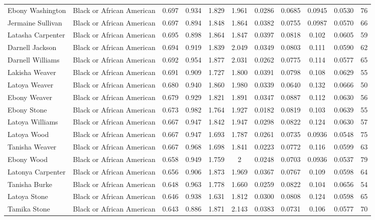\documentclass[]{article}
\begin{document}
\begin{tabular}{lcccccccccc}
Ebony Washington & Black or African American & 0.697 & 0.934 & 1.829 & 1.961 & 0.0286 & 0.0685 & 0.0945 & 0.0530 & 76 \\
Jermaine Sullivan & Black or African American & 0.697 & 0.894 & 1.848 & 1.864 & 0.0382 & 0.0755 & 0.0987 & 0.0570 & 66 \\
Latasha Carpenter & Black or African American & 0.695 & 0.898 & 1.864 & 1.847 & 0.0397 & 0.0818 & 0.102 & 0.0605 & 59 \\
Darnell Jackson & Black or African American & 0.694 & 0.919 & 1.839 & 2.049 & 0.0349 & 0.0803 & 0.111 & 0.0590 & 62 \\
Darnell Williams & Black or African American & 0.692 & 0.954 & 1.877 & 2.031 & 0.0262 & 0.0775 & 0.114 & 0.0577 & 65 \\
Lakisha Weaver & Black or African American & 0.691 & 0.909 & 1.727 & 1.800 & 0.0391 & 0.0798 & 0.108 & 0.0629 & 55 \\
Latoya Weaver & Black or African American & 0.680 & 0.940 & 1.860 & 1.980 & 0.0339 & 0.0640 & 0.132 & 0.0666 & 50 \\
Ebony Weaver & Black or African American & 0.679 & 0.929 & 1.821 & 1.891 & 0.0347 & 0.0887 & 0.112 & 0.0630 & 56 \\
Ebony Stone & Black or African American & 0.673 & 0.982 & 1.764 & 1.927 & 0.0182 & 0.0819 & 0.103 & 0.0639 & 55 \\
Latoya Williams & Black or African American & 0.667 & 0.947 & 1.842 & 1.947 & 0.0298 & 0.0822 & 0.124 & 0.0630 & 57 \\
Latoya Wood & Black or African American & 0.667 & 0.947 & 1.693 & 1.787 & 0.0261 & 0.0735 & 0.0936 & 0.0548 & 75 \\
Tanisha Weaver & Black or African American & 0.667 & 0.968 & 1.698 & 1.841 & 0.0223 & 0.0772 & 0.116 & 0.0599 & 63 \\
Ebony Wood & Black or African American & 0.658 & 0.949 & 1.759 & 2 & 0.0248 & 0.0703 & 0.0936 & 0.0537 & 79 \\
Latonya Carpenter & Black or African American & 0.656 & 0.906 & 1.873 & 1.969 & 0.0367 & 0.0767 & 0.109 & 0.0598 & 64 \\
Tanisha Burke & Black or African American & 0.648 & 0.963 & 1.778 & 1.660 & 0.0259 & 0.0822 & 0.104 & 0.0656 & 54 \\
Latoya Stone & Black or African American & 0.646 & 0.938 & 1.631 & 1.812 & 0.0300 & 0.0808 & 0.124 & 0.0598 & 65 \\
Tamika Stone & Black or African American & 0.643 & 0.886 & 1.871 & 2.143 & 0.0383 & 0.0731 & 0.106 & 0.0577 & 70 \\

\end{tabular}
\end{document}
